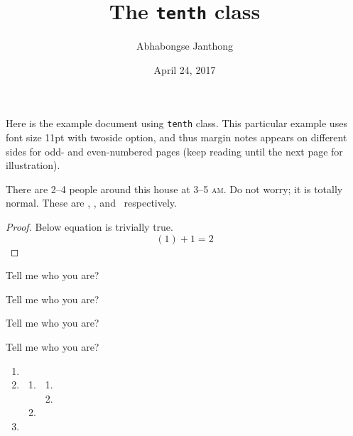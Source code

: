\documentclass[11pt,twoside]{tenth}
\title{The \texttt{tenth} class}
\author{Abhabongse Janthong}
\date{April 24, 2017}
\begin{document}
    \maketitle

    Here is the example document using \texttt{tenth} class. This particular example uses font size 11pt with twoside option, and thus margin notes  appears on different sides for odd- and even-numbered pages (keep reading until the next page for illustration).

    \lipsum[1-5]

    There are 2--4 people around this house at 3--5 \textsc{am}.  Do not worry; it is totally normal. These are \redsq, \greensq, and \bluesq\ respectively.

    \begin{proof}
        Below equation is trivially true.
        \begin{equation}
            (1) + 1 = 2
        \end{equation}
    \end{proof}

    \begin{question}
        Tell me who you are?
    \end{question}
    \begin{definition}
        Tell me who you are?
    \end{definition}
    \begin{theorem}
        Tell me who you are?
    \end{theorem}
    \begin{remark}
        Tell me who you are?
    \end{remark}

    \begin{enumerate}
        \item \lipsum[1-3]
        \item \lipsum[2-4]
            \begin{enumerate}
                \item \lipsum[3-5]
                    \begin{enumerate}
                        \item \lipsum[3-5]
                        \item \lipsum[4-6]
                    \end{enumerate}
                \item \lipsum[4-6]
            \end{enumerate}
        \item \lipsum[2-4]
    \end{enumerate}
\end{document}
